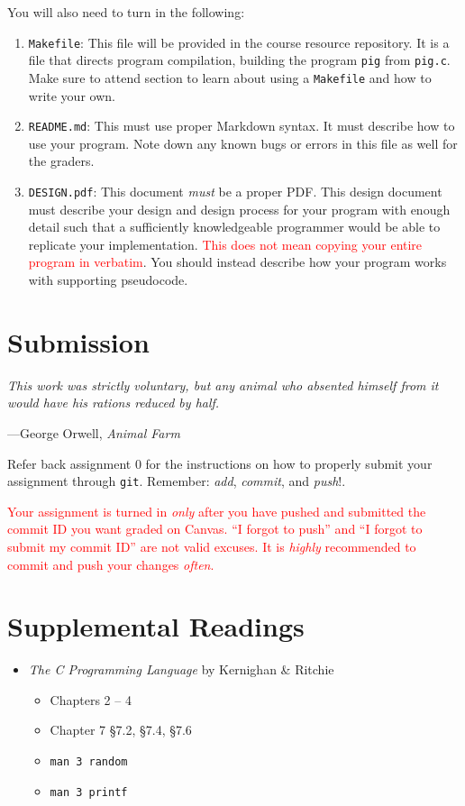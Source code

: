 \documentclass{article}
\begin{document}
You will also need to turn in the following:

\begin{enumerate}
  \item \texttt{Makefile}:
    This file will be provided in the course resource repository. It is
    a file that directs program compilation, building the program
    \texttt{pig} from \texttt{pig.c}. Make sure to attend section to
    learn about using a \texttt{Makefile} and how to write your own.
  \item \texttt{README.md}: This must use proper Markdown syntax. It
    must describe how to use your program. Note down any known bugs or
    errors in this file as well for the graders.
  \item \texttt{DESIGN.pdf}: This document \emph{must} be a proper
    PDF\@. This design document must describe your design and design
    process for your program with enough detail such that a sufficiently
    knowledgeable programmer would be able to replicate your
    implementation. \textcolor{red}{This does not mean copying your
    entire program in verbatim}. You should instead describe how your
    program works with supporting pseudocode.
\end{enumerate}

\section{Submission}

\textwidth \epigraph{\emph{This work was strictly
voluntary, but any animal who absented himself from it would have his
rations reduced by half.}}{---George Orwell, \emph{Animal Farm}}

\noindent
Refer back assignment 0 for the instructions on how to properly submit
your assignment through \texttt{git}. Remember: \emph{add},
\emph{commit}, and \emph{push}!.

\textcolor{red}{Your assignment is turned in \emph{only} after you have
pushed and submitted the commit ID you want graded on Canvas. ``I
forgot to push'' and ``I forgot to submit my commit ID'' are not valid
excuses. It is \emph{highly} recommended to commit and push your changes
\emph{often}.}

\section{Supplemental Readings}

\begin{itemize}
  \item \textit{The C Programming Language} by Kernighan \& Ritchie
  \begin{itemize}
    \item Chapters 2 -- 4
    \item Chapter 7 \S 7.2, \S 7.4, \S 7.6
    \item \texttt{man 3 random}
    \item \texttt{man 3 printf}
  \end{itemize}
\end{itemize}

\end{document}
